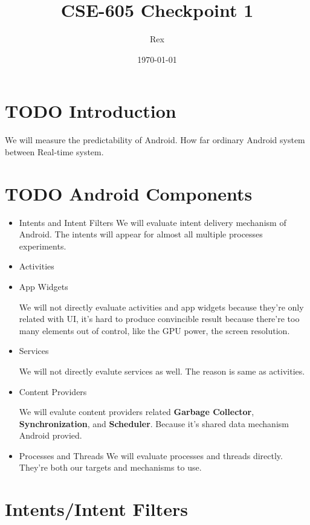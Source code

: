 \documentclass[11pt]{article}
\author{Rex}
\date{\today}
\title{CSE-605 Checkpoint 1}
\begin{document}
\maketitle
\tableofcontents


\section{{\bfseries\sffamily TODO} Introduction}
\label{sec-1}
We will measure the predictability of Android.
How far ordinary Android system between Real-time system.

\section{{\bfseries\sffamily TODO} Android Components}
\label{sec-2}
\begin{itemize}
\item Intents and Intent Filters
We will evaluate intent delivery mechanism of Android.
The intents will appear for almost all multiple processes experiments.

\item Activities
\item App Widgets

We will not directly evaluate activities and app widgets because they're only related with UI,
it's hard to produce convincible result because there're too many elements out of control,
like the GPU power, the screen resolution.

\item Services

We will not directly evalute services as well. The reason is same as activities.
\item Content Providers

We will evalute content providers related \textbf{Garbage Collector}, \textbf{Synchronization},
and \textbf{Scheduler}. Because it's shared data mechanism Android provied.
\end{itemize}


\begin{itemize}
\item Processes and Threads
We will evaluate processes and threads directly.
They're both our targets and mechanisms to use.
\end{itemize}

\section{Intents/Intent Filters}
\label{sec-3}
\end{document}
